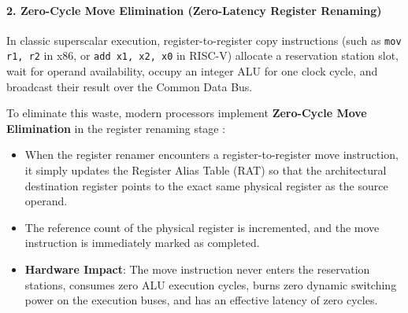 \paragraph{2. Zero-Cycle Move Elimination (Zero-Latency Register Renaming)}
In classic superscalar execution, register-to-register copy instructions (such as \texttt{mov r1, r2} in x86, or \texttt{add x1, x2, x0} in RISC-V) allocate a reservation station slot, wait for operand availability, occupy an integer ALU for one clock cycle, and broadcast their result over the Common Data Bus.

To eliminate this waste, modern processors implement \textbf{Zero-Cycle Move Elimination} in the register renaming stage \cite{jourdan1999extended}:
\begin{itemize}
    \item When the register renamer encounters a register-to-register move instruction, it simply updates the Register Alias Table (RAT) so that the architectural destination register points to the exact same physical register as the source operand.
    \item The reference count of the physical register is incremented, and the move instruction is immediately marked as completed.
    \item \textbf{Hardware Impact}: The move instruction never enters the reservation stations, consumes zero ALU execution cycles, burns zero dynamic switching power on the execution buses, and has an effective latency of zero cycles.
\end{itemize}

